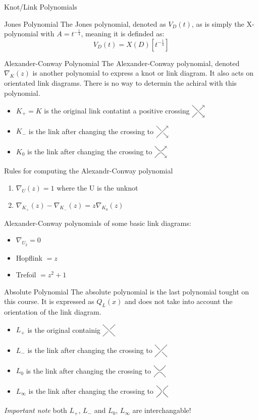 \documentclass[12pt, letterpaper]{article}
\newcommand{\KP}[1]{%
  \begin{tikzpicture}[baseline=-\dimexpr\fontdimen22\textfont2\relax]
  #1
  \end{tikzpicture}%
}
\newcommand{\UCross}{%
  \KP{
    \draw[color=gray,thick] (-0.3,0.3) -- (0.3,-0.3);
    \draw[color=gray,thick] (-0.3,-0.3) -- (-0.05,-0.05);
    \draw[color=gray,thick] (0.05,0.05) -- (0.3,0.3);
  }%
}
\newcommand{\UOCross}{%
  \KP{
    \draw[color=gray,thick] (-0.3,0.3) -- (-0.05,0.05);
    \draw[color=gray,thick] (0.05,-0.05) -- (0.3,-0.3);
    \draw[color=gray,thick] (-0.3,-0.3) -- (0.3,0.3);
  }%
}
\newcommand{\DPCross}{%
  \KP{
    \draw[color=gray,thick,->] (-0.3,0.3) -- (0.3,-0.3);
    \draw[color=gray,thick] (-0.3,-0.3) -- (-0.05,-0.05);
    \draw[color=gray,thick,->] (0.05,0.05) -- (0.3,0.3);
  }%
}
\newcommand{\DNCross}{%
  \KP{
    \draw[color=gray,thick] (-0.3,0.3) -- (-0.05,0.05);
    \draw[color=gray,thick,->] (0.05,-0.05) -- (0.3,-0.3);
    \draw[color=gray,thick,->] (-0.3,-0.3) -- (0.3,0.3);
  }%
}
\newcommand{\RSmooth}{%
  \KP{%
    \draw[color=gray,thick] (-0.3,0.3)..controls (0,-0.05).. (0.3,0.3);
    \draw[color=gray,thick] (-0.3,-0.3)..controls (0,0.05).. (0.3,-0.3);
  }%
}
\newcommand{\LSmooth}{%
  \KP{%
    \draw[color=gray,thick] (-0.3,-0.3)..controls (0.05,0).. (-0.3,0.3);
    \draw[color=gray,thick] (0.3,-0.3)..controls (-0.05,0).. (0.3,0.3);
  }%
}
\newcommand{\DSmooth}{%
  \KP{%
    \draw[color=gray,thick,->] (-0.3,0.3)..controls (0,-0.05).. (0.3,0.3);
    \draw[color=gray,thick,->] (-0.3,-0.3)..controls (0,0.05).. (0.3,-0.3);
  }%
}
\begin{document}
\begin{section}{Knot/Link Polynomials}
  \begin{subsection}{Jones Polynomial}
    The Jones polynomial, denoted as \(V_{D}(t)\), as is simply the X-polynomial
    with \(A = t^{-\frac{1}{4}}\), meaning it is definded as:
    \[V_{D}(t) = X(D)[t^{-\frac{1}{4}}]\]
  \end{subsection}

  \begin{subsection}{Alexander-Conway Polynomial}
    The Alexander-Conway polynomial, denoted \(\nabla_{K}(z)\)
    is another polynomial to express a knot or link diagram. It also acts on
    orientated link diagrams.
    There is no way to determin the achiral with this polynomial.

    \begin{itemize}
      \item \(K_{+} = K\) is the original link contatint a positive crossing
            \(\DPCross\)
      \item \(K_{-}\) is the link after changing the crossing to \(\DNCross\)
      \item \(K_{0}\) is the link after changing the crossing to \(\DSmooth\)
    \end{itemize}

    Rules for computing the Alexandr-Conway polynomial
    \begin{enumerate}
      \item \(\nabla_{U}(z) = 1\) where the U is the unknot
      \item \(\nabla_{K_{+}}(z) - \nabla_{K_{-}}(z) = z\nabla_{K_{0}}(z)\)
    \end{enumerate}

    Alexander-Conway polynomials of some basic link diagrams:
    \begin{itemize}
      \item \(\nabla_{U_{2}} = 0\)
      \item Hopflink \(= z\)
      \item Trefoil \(= z^{2} + 1\)
    \end{itemize}
  \end{subsection}

  \begin{subsection}{Absolute Polynomial}
    The absolute polynomial is the last polynomial tought on this course.
    It is expressed as \(Q_{L}(x)\) and does not take into account the orientation
    of the link diagram.

    \begin{itemize}
      \item \(L_{+}\) is the original containig \(\UCross\)
      \item \(L_{-}\) is the link after changing the crossing to \(\UOCross\)
      \item \(L_{0}\) is the link after changing the crossing to \(\RSmooth\)
      \item \(L_{\infty}\) is the link after changing the crossing to \(\LSmooth\)
    \end{itemize}
    \emph{Important note} both \(L_{+}\), \(L_{-}\) and  \(L_{0}\), \(L_{\infty}\)
    are interchangable!


\end{subsection}
\end{section}
\end{document}
